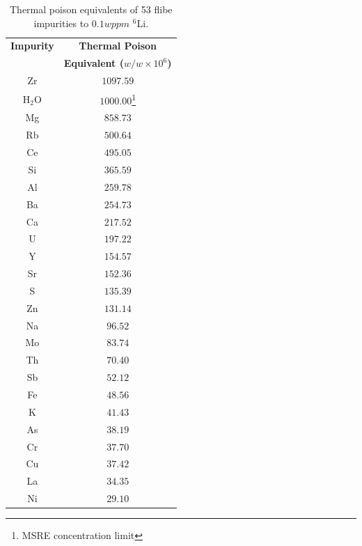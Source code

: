 \documentclass[11pt]{article}
\newcommand{\E}[1]{\times10^{#1}}
\newcommand{\iso}[2]{$^{#2}\mathrm{#1}$}
\newcommand{\water}[0]{$\mathrm{H_2O}$}
\begin{document}
\clearpage
\begin{table}[ht]\footnotesize
    \centering
    \caption{Thermal poison equivalents of 53 flibe impurities to $0.1wppm$ \iso{Li}{6}.}
    \label{tab:thermalLimits}
    \begin{tabular}{| c | c |} \hline
    \textbf{Impurity} & \textbf{Thermal Poison} \\
                     &  \textbf{Equivalent ($w/w \E{6}$)} \\ \hline
    Zr               & $1097.59$ \\ \hline
    \water{}         & $1000.00$\footnote{MSRE concentration limit} \\ \hline
    Mg               &  $858.73$ \\ \hline
    Rb               &  $500.64$ \\ \hline
    Ce               &  $495.05$ \\ \hline
    Si               &  $365.59$ \\ \hline
    Al               &  $259.78$ \\ \hline
    Ba               &  $254.73$ \\ \hline
    Ca               &  $217.52$ \\ \hline
    U                &  $197.22$ \\ \hline
    Y                &  $154.57$ \\ \hline
    Sr               &  $152.36$ \\ \hline
    S                &  $135.39$ \\ \hline
    Zn               &  $131.14$ \\ \hline
    Na               &   $96.52$ \\ \hline
    Mo               &   $83.74$ \\ \hline
    Th               &   $70.40$ \\ \hline
    Sb               &   $52.12$ \\ \hline
    Fe               &   $48.56$ \\ \hline
    K                &   $41.43$ \\ \hline
    As               &   $38.19$ \\ \hline
    Cr               &   $37.70$ \\ \hline
    Cu               &   $37.42$ \\ \hline
    La               &   $34.35$ \\ \hline
    Ni               &   $29.10$ \\ \hline

\end{tabular}
\end{table}
\end{document}
